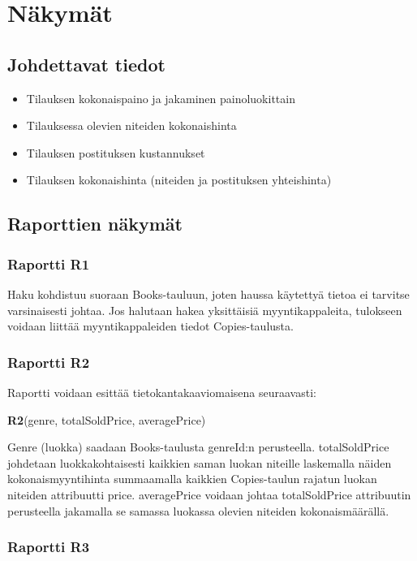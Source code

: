 \documentclass[11pt,a4paper]{article}
\begin{document}
\section{Näkymät}

\subsection{Johdettavat tiedot}

\begin{itemize}
	\item Tilauksen kokonaispaino ja jakaminen painoluokittain
	\item Tilauksessa olevien niteiden kokonaishinta
	\item Tilauksen postituksen kustannukset
	\item Tilauksen kokonaishinta (niteiden ja postituksen yhteishinta)
\end{itemize}

\subsection{Raporttien näkymät}

\subsubsection{Raportti R1}

Haku kohdistuu suoraan Books-tauluun, joten haussa käytettyä tietoa ei tarvitse varsinaisesti johtaa. Jos halutaan hakea yksittäisiä myyntikappaleita, tulokseen voidaan liittää myyntikappaleiden tiedot Copies-taulusta.

\subsubsection{Raportti R2}

Raportti voidaan esittää tietokantakaaviomaisena seuraavasti:

\textbf{R2}(genre, totalSoldPrice, averagePrice)

Genre (luokka) saadaan Books-taulusta genreId:n perusteella. totalSoldPrice johdetaan luokkakohtaisesti kaikkien saman luokan niteille laskemalla näiden kokonaismyyntihinta summaamalla kaikkien Copies-taulun rajatun luokan niteiden attribuutti price. averagePrice voidaan johtaa totalSoldPrice attribuutin perusteella jakamalla se samassa luokassa olevien niteiden kokonaismäärällä.

\subsubsection{Raportti R3}
\end{document}

